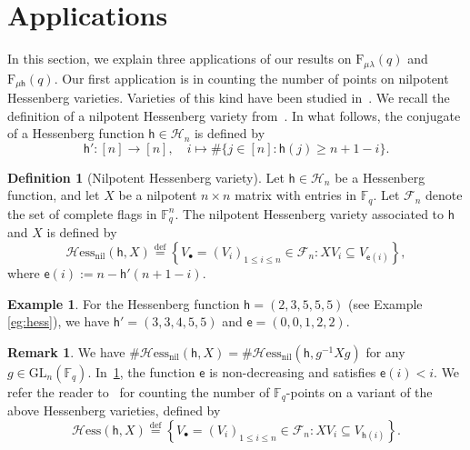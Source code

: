 \documentclass[12pt,a4paper,reqno]{amsart}
\theoremstyle{plain}
\theoremstyle{definition}
\newtheorem{definition}[theorem]{Definition}
\newtheorem{remark}[theorem]{Remark}
\newtheorem{example}[theorem]{Example}
\newcommand{\defin}{\overset{\mathrm{def}}{=}}
\newcommand{\FF}{{\mathbb{F}}}
\newcommand{\1}{\mathds{1}}
\newcommand{\GL}{\mathrm{GL}}
\newcommand{\F}{\mathrm{F}}
\renewcommand{\u}{\mathfrak{u}}
\newcommand{\hes}{\mathsf{h}}
\begin{document}
\section{Applications}
In this section, we explain three applications of our 
results on $\F_{\mu\lambda}(q)$ and $\F_{\mu\hes}(q)$. 
Our first application  is in counting the number of points on nilpotent Hessenberg varieties. 
Varieties of this kind have been studied in~\cite{Tymoczko,Ji-Precup,Precup-Sommers}.
We recall the definition of a  nilpotent Hessenberg variety from~\cite{Precup-Sommers}. 
In what follows, the conjugate of a Hessenberg function $\hes\in\mathcal{H}_n$ is defined by 
$$
\hes': [n]\to [n],\quad i\mapsto \#\{j\in [n]: \hes(j)\geq n+1-i\}. 
$$
\begin{definition}[Nilpotent Hessenberg variety]\label{Nil_hes:def} Let $\hes \in \mathcal{H}_n$ be a Hessenberg function, and let $X$ be a nilpotent $n\times n$ matrix with entries in $\FF_q$. Let 
$\mathscr{F}_n$ denote
the set of complete flags in $\FF_q^n$. The nilpotent Hessenberg variety associated to $\hes$ and $X$ is defined by 
$$
\text{$\mathcal{H}$ess$_\mathrm{nil}$}(\hes,X)\defin \left\{V_\bullet=(V_i)_{1\leq i\leq n}\in\mathscr{F}_n: XV_i\subseteq V_{\mathsf{e}(i)} \right\},
$$
where $\mathsf{e}(i):=n-\hes'(n+1-i)$.
\end{definition}
\begin{example}
  For the Hessenberg function $\hes=(2,3,5,5,5)$ (see Example \ref{eg:hess}), we have $\hes'=(3,3,4,5,5)$ and $\mathsf{e}=(0,0,1,2,2)$.
\end{example}

\begin{remark} We have $\#\text{$\mathcal{H}$ess$_\mathrm{nil}$}(\hes,X)=\#\text{$\mathcal{H}$ess$_\mathrm{nil}$}(\hes,g^{-1}Xg)$ for any $g\in \GL_n(\FF_q)$. %
  In~\cref{Nil_hes:def}, the function $\mathsf{e}$ is non-decreasing and satisfies $\mathsf{e}(i)<i$. %
  We refer the reader to~\cite{Abreu-Nigro-Ram} for counting the number of $\FF_q$-points on a variant of the above Hessenberg varieties, defined by
$$
\text{$\mathcal{H}$ess}(\hes,X)\defin \left\{V_\bullet=(V_i)_{1\leq i\leq n}\in\mathscr{F}_n: XV_i\subseteq V_{\mathsf{h}(i)} \right\}.
$$
\end{remark}
\end{document}
